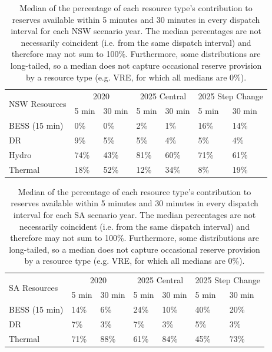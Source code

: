 \documentclass[12pt,a4paper,]{report}
\begin{document}
\begin{table}
  \centering
  \begin{tabular}{|l|l|l|l|l|l|l|}
    \hline
    \multirow{2}{*}{NSW Resources} &
      \multicolumn{2}{c}{2020} &
      \multicolumn{2}{c}{2025 Central} &
      \multicolumn{2}{c|}{2025 Step Change} \\
    & 5 min & 30 min & 5 min & 30 min & 5 min & 30 min \\
    \hline
    BESS (15 min) & 0\% & 0\% & 2\% & 1\% & 16\% & 14\% \\
    \hline
    DR & 9\% & 5\% & 5\% & 4\% & 5\% & 4\% \\
    \hline
    Hydro & 74\% & 43\% & 81\% & 60\% & 71\% & 61\% \\
    \hline
    Thermal & 18\% & 52\% & 12\% & 34\% & 8\% & 19\% \\
    \hline
  \end{tabular}
  \caption[NSW short-term energy limited reserves]{\label{tab:nsw_stel}Median of the percentage of each resource type's contribution to reserves available within 5 minutes and 30 minutes in every dispatch interval for each NSW scenario year. The median percentages are not necessarily coincident (i.e. from the same dispatch interval) and therefore may not sum to 100\%. Furthermore, some distributions are long-tailed, so a median does not capture occasional reserve provision by a resource type (e.g. VRE, for which all medians are 0\%).}
\end{table}

\begin{table}
  \centering
  \begin{tabular}{|l|l|l|l|l|l|l|}
    \hline
    \multirow{2}{*}{SA Resources} &
      \multicolumn{2}{c}{2020} &
      \multicolumn{2}{c}{2025 Central} &
      \multicolumn{2}{c|}{2025 Step Change} \\
    & 5 min & 30 min & 5 min & 30 min & 5 min & 30 min \\
    \hline
    BESS (15 min) & 14\% & 6\% & 24\% & 10\% & 40\% & 20\% \\
    \hline
    DR & 7\% & 3\% & 7\% & 3\% & 5\% & 3\% \\
    \hline
    Thermal & 71\% & 88\% & 61\% & 84\% & 45\% & 73\% \\
    \hline
  \end{tabular}
  \caption[SA short-term energy limited reserves]{\label{tab:sa_stel}Median of the percentage of each resource type's contribution to reserves available within 5 minutes and 30 minutes in every dispatch interval for each SA scenario year. The median percentages are not necessarily coincident (i.e. from the same dispatch interval) and therefore may not sum to 100\%. Furthermore, some distributions are long-tailed, so a median does not capture occasional reserve provision by a resource type (e.g. VRE, for which all medians are 0\%).}
\end{table}
\end{document}
